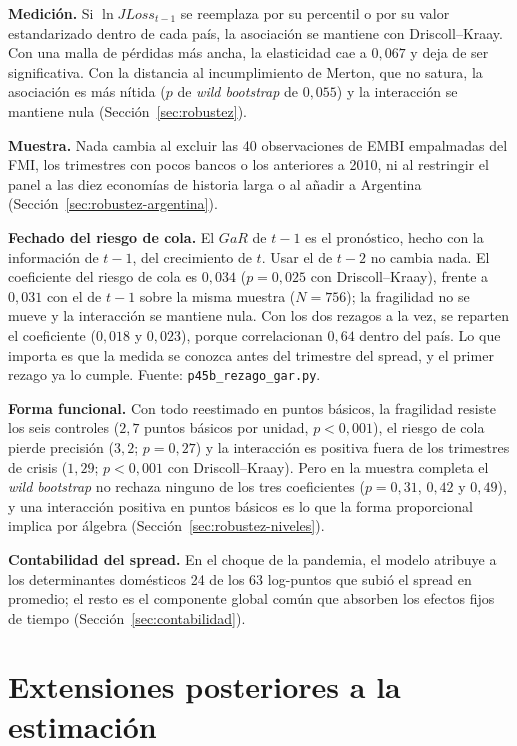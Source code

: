 \textbf{Medición.} Si $\ln JLoss_{t-1}$ se reemplaza por su percentil o por su valor estandarizado dentro de cada país, la asociación se mantiene con Driscoll--Kraay. Con una malla de pérdidas más ancha, la elasticidad cae a $0{,}067$ y deja de ser significativa. Con la distancia al incumplimiento de Merton, que no satura, la asociación es más nítida ($p$ de \textit{wild bootstrap} de $0{,}055$) y la interacción se mantiene nula (Sección~\ref{sec:robustez}).

\textbf{Muestra.} Nada cambia al excluir las 40 observaciones de EMBI empalmadas del FMI, los trimestres con pocos bancos o los anteriores a 2010, ni al restringir el panel a las diez economías de historia larga o al añadir a Argentina (Sección~\ref{sec:robustez-argentina}).

\textbf{Fechado del riesgo de cola.} El $GaR$ de $t-1$ es el pronóstico, hecho con la información de $t-1$, del crecimiento de $t$. Usar el de $t-2$ no cambia nada. El coeficiente del riesgo de cola es $0{,}034$ ($p=0{,}025$ con Driscoll--Kraay), frente a $0{,}031$ con el de $t-1$ sobre la misma muestra ($N=756$); la fragilidad no se mueve y la interacción se mantiene nula. Con los dos rezagos a la vez, se reparten el coeficiente ($0{,}018$ y $0{,}023$), porque correlacionan $0{,}64$ dentro del país. Lo que importa es que la medida se conozca antes del trimestre del spread, y el primer rezago ya lo cumple. Fuente: \texttt{p45b\_rezago\_gar.py}.

\textbf{Forma funcional.} Con todo reestimado en puntos básicos, la fragilidad resiste los seis controles ($2{,}7$ puntos básicos por unidad, $p<0{,}001$), el riesgo de cola pierde precisión ($3{,}2$; $p=0{,}27$) y la interacción es positiva fuera de los trimestres de crisis ($1{,}29$; $p<0{,}001$ con Driscoll--Kraay). Pero en la muestra completa el \textit{wild bootstrap} no rechaza ninguno de los tres coeficientes ($p=0{,}31$, $0{,}42$ y $0{,}49$), y una interacción positiva en puntos básicos es lo que la forma proporcional implica por álgebra (Sección~\ref{sec:robustez-niveles}).

\textbf{Contabilidad del spread.} En el choque de la pandemia, el modelo atribuye a los determinantes domésticos 24 de los 63 log-puntos que subió el spread en promedio; el resto es el componente global común que absorben los efectos fijos de tiempo (Sección~\ref{sec:contabilidad}).

\section{Extensiones posteriores a la estimación}
\label{sec:extensiones}

